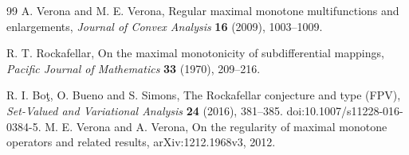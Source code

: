 \documentclass[11pt]{article}
\begin{document}
\begin{thebibliography}{99}
A. Verona and M. E. Verona,
Regular maximal monotone multifunctions and enlargements,
\emph{Journal of Convex Analysis} \textbf{16} (2009), 1003--1009.

R. T. Rockafellar,
On the maximal monotonicity of subdifferential mappings,
\emph{Pacific Journal of Mathematics} \textbf{33} (1970), 209--216.

R. I. Bo\c{t}, O. Bueno and S. Simons,
The Rockafellar conjecture and type (FPV),
\emph{Set-Valued and Variational Analysis} \textbf{24} (2016), 381--385.
doi:10.1007/s11228-016-0384-5.
\ifdefined\expandedversion
{}
M. E. Verona and A. Verona,
On the regularity of maximal monotone operators and related results,
arXiv:1212.1968v3, 2012.
\fi
\end{thebibliography}
\end{document}

